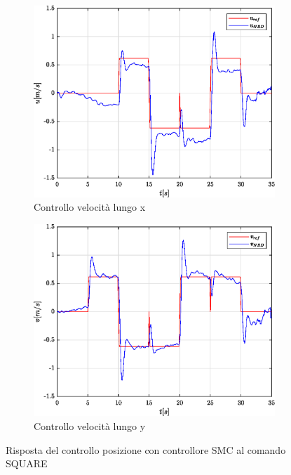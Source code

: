 \begin{figure}
\begin{subfigure}{0.45\textwidth}
		\label{fig:SQUAREerrposySMC}
	\end{subfigure}
	\\
	\begin{subfigure}{0.45\textwidth}
		\centering
		\includegraphics[width=1\textwidth]{Simulazioni/Figure/SMC/SQUARE/PositionControlXVel}
		\caption{Controllo velocità lungo x}
		\label{fig:SQUAREerrvelxSMC}
	\end{subfigure}
	\hfill
	\begin{subfigure}{0.45\textwidth}
		\centering
		\includegraphics[width=1\textwidth]{Simulazioni/Figure/SMC/SQUARE/PositionControlYVel}
		\caption{Controllo velocità lungo y}
		\label{fig:SQUAREerrvelySMC}
	\end{subfigure}
	\caption{Risposta del controllo posizione con controllore SMC al comando SQUARE}
\end{figure}

